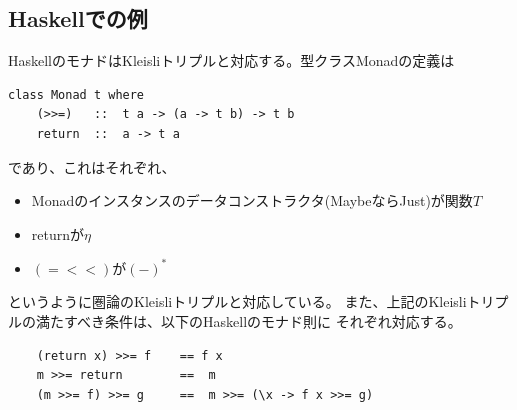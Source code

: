 \subsection{Haskellでの例}
HaskellのモナドはKleisliトリプルと対応する。型クラスMonadの定義は
\begin{lstlisting}
class Monad t where
    (>>=)   ::  t a -> (a -> t b) -> t b
    return  ::  a -> t a
\end{lstlisting}
であり、これはそれぞれ、
\begin{itemize}
    \item Monadのインスタンスのデータコンストラクタ(MaybeならJust)が関数$T$
    \item returnが$\eta$
    \item $(=<<)$が$(-)^*$
\end{itemize}
というように圏論のKleisliトリプルと対応している。
また、上記のKleisliトリプルの満たすべき条件は、以下のHaskellのモナド則に
それぞれ対応する。
\begin{lstlisting}
    (return x) >>= f    == f x
    m >>= return        ==  m
    (m >>= f) >>= g     ==  m >>= (\x -> f x >>= g)
\end{lstlisting}
